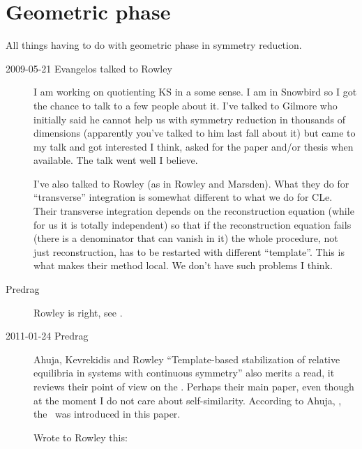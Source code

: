 

\chapter{Geometric phase}
\label{c-geometric}

All things having to do with geometric phase in symmetry reduction.

\begin{description}

\item[2009-05-21 Evangelos talked to Rowley]
I am working on quotienting KS in a some sense. I am in
Snowbird so I got the chance to talk to a few people about
it. I've talked to Gilmore who initially said he cannot help
us with symmetry reduction in thousands of dimensions
(apparently you've talked to him last fall about it) but came
to my talk and got interested I think, asked for the paper
and/or thesis when available. The talk went well I believe.

I've also talked to Rowley (as in Rowley and Marsden). What
they do for ``transverse'' integration is somewhat different to
what we do for CLe. Their transverse integration depends on
the reconstruction equation (while for us it is totally
independent) so that if the reconstruction equation fails
(there is a denominator that can vanish in it) the whole
procedure, not just reconstruction, has to be restarted with
different ``template''. This is what makes their method local.
We don't have such problems I think.

\item[Predrag]
Rowley is right, see .

\item[2011-01-24 Predrag]                               \toCB
Ahuja, Kevrekidis and Rowley
 {``Template-based
stabilization} of relative equilibria in systems with continuous
symmetry'' also merits a read, it reviews their point of view on the
\mslices. Perhaps their main paper, even though at the moment I do
not care about self-similarity. According to Ahuja,
\etal{}, the \mslices\ was introduced in
this paper.

Wrote to Rowley this:


\end{description}
